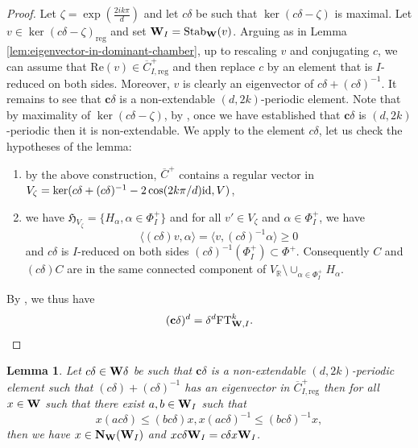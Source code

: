 \documentclass[article, 10pt, oneside, reqno]{amsart}
\theoremstyle{plain}
\newtheorem{lem}[thm]{Lemma}
\theoremstyle{definition}
\theoremstyle{remark}
\newcommand{\FT}{\mathrm{FT}}
\newcommand{\reg}{\mathrm{reg}}
\newcommand{\Rbb}{\mathbb{R}}
\newcommand{\Hfrak}{\mathfrak{H}}
\newcommand{\cbf}{\mathbf{c}}
\begin{document}
\begin{proof}
Let $\zeta = \exp(\frac{2ik\pi}{d})$ and let $c\delta$ be such that $\ker(c\delta - \zeta)$ is maximal. Let $v \in \ker(c\delta - \zeta)_{\reg}$ and set $\mathbf{W}_I = \mathrm{Stab}_{\mathbf{W}}(v)$. Arguing as in Lemma \ref{lem:eigenvector-in-dominant-chamber}, up to rescaling $v$ and conjugating $c$, we can assume that $\mathrm{Re}(v) \in \overline{C}^+_{I, \reg}$ and then replace $c$ by an element that is $I$-reduced on both sides. Moreover, $v$ is clearly an eigenvector of $c\delta + (c\delta)^{-1}$. It remains to see that $\cbf\delta$ is a non-extendable $(d,2k)$-periodic element. Note that by maximality of $\ker(c\delta - \zeta)$, by \cite[Theorem 8.3]{DigneMichelParabolic}, once we have established that $\cbf\delta$ is $(d,2k)$-periodic then it is non-extendable. We apply \cite[Lemma 5.1]{HeNie} to the element $c\delta$, let us check the hypotheses of the lemma: 
\begin{enumerate}
\item by the above construction, $\overline{C}^+$ contains a regular vector in $V_{\zeta} = \ker(c\delta + (c\delta)^{-1} - 2\cos(2k\pi/d)\mathrm{id}, V)$, 
\item we have $\Hfrak_{V_{\zeta}} = \{H_{\alpha}, \alpha \in \Phi_I^+\}$ and for all $v' \in V_{\zeta}$ and $\alpha \in \Phi_I^+$, we have 
$$\langle (c\delta)v, \alpha \rangle = \langle v, (c\delta)^{-1}\alpha \rangle \geq 0$$
and $c\delta$ is $I$-reduced on both sides $(c\delta)^{-1}(\Phi_I^+) \subset \Phi^+$. Consequently $C$ and $(c\delta)C$ are in the same connected component of $V_{\Rbb} \setminus \cup_{\alpha \in \Phi_I^+} H_{\alpha}$.
\end{enumerate}
By \cite[Lemma 5.1]{HeNie}, we thus have 
$$(\cbf\delta)^d = \delta^d \FT_{\Wbf,I}^k.$$
\end{proof}

\begin{lem}\label{lem:coset-centralizer-of-periodic-elements}
Let $c\delta \in \mathbf{W}\delta$ be such that $\cbf\delta$ is a non-extendable $(d,2k)$-periodic element such that $(c\delta) + (c\delta)^{-1}$ has an eigenvector in $\overline{C}^+_{I, \reg}$ then for all $x \in \mathbf{W}$ such that there exist $a,b \in \mathbf{W}_{I}$ such that 
$$x(ac\delta) \leq (bc\delta)x, x(ac\delta)^{-1} \leq (bc\delta)^{-1}x,$$
then we have $x \in \mathbf{N}_{\mathbf{W}}(\mathbf{W}_{I})$ and $xc\delta\mathbf{W}_{I} = c\delta x\mathbf{W}_{I}$. 
\end{lem}
\end{document}

